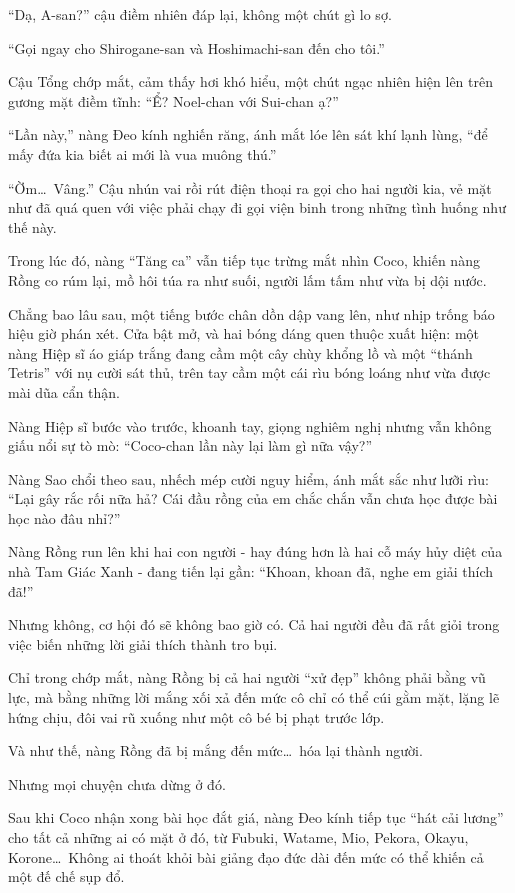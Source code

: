 \documentclass[../main.tex]{subfiles}
\begin{document}
``Dạ, A-san?'' cậu điềm nhiên đáp lại, không một chút gì lo sợ.

``Gọi ngay cho Shirogane-san và Hoshimachi-san đến cho tôi.''

Cậu Tổng chớp mắt, cảm thấy hơi khó hiểu, một chút ngạc nhiên hiện lên trên gương mặt điềm tĩnh: ``Ể? Noel-chan với Sui-chan ạ?''

``Lần này,'' nàng Đeo kính nghiến răng, ánh mắt lóe lên sát khí lạnh lùng, ``để mấy đứa kia biết ai mới là vua muông thú.''

``Ờm\dots\ Vâng.'' Cậu nhún vai rồi rút điện thoại ra gọi cho hai người kia, vẻ mặt như đã quá quen với việc phải chạy đi gọi viện binh trong những tình huống như thế này.

Trong lúc đó, nàng ``Tăng ca'' vẫn tiếp tục trừng mắt nhìn Coco, khiến nàng Rồng co rúm lại, mồ hôi túa ra như suối, người lấm tấm như vừa bị dội nước.

\ct

Chẳng bao lâu sau, một tiếng bước chân dồn dập vang lên, như nhịp trống báo hiệu giờ phán xét. Cửa bật mở, và hai bóng dáng quen thuộc xuất hiện: một nàng Hiệp sĩ áo giáp trắng đang cầm một cây chùy khổng lồ và một ``thánh Tetris'' với nụ cười sát thủ, trên tay cầm một cái rìu bóng loáng như vừa được mài dũa cẩn thận.

Nàng Hiệp sĩ bước vào trước, khoanh tay, giọng nghiêm nghị nhưng vẫn không giấu nổi sự tò mò: ``Coco-chan lần này lại làm gì nữa vậy?''

Nàng Sao chổi theo sau, nhếch mép cười nguy hiểm, ánh mắt sắc như lưỡi rìu: ``Lại gây rắc rối nữa hả? Cái đầu rồng của em chắc chắn vẫn chưa học được bài học nào đâu nhỉ?''

Nàng Rồng run lên khi hai con người - hay đúng hơn là hai cỗ máy hủy diệt của nhà Tam Giác Xanh - đang tiến lại gần: ``Khoan, khoan đã, nghe em giải thích đã!''

Nhưng không, cơ hội đó sẽ không bao giờ có. Cả hai người đều đã rất giỏi trong việc biến những lời giải thích thành tro bụi.

Chỉ trong chớp mắt, nàng Rồng bị cả hai người ``xử đẹp'' không phải bằng vũ lực, mà bằng những lời mắng xối xả đến mức cô chỉ có thể cúi gằm mặt, lặng lẽ hứng chịu, đôi vai rũ xuống như một cô bé bị phạt trước lớp.

Và như thế, nàng Rồng đã bị mắng đến mức\dots\ hóa lại thành người.

Nhưng mọi chuyện chưa dừng ở đó.

Sau khi Coco nhận xong bài học đắt giá, nàng Đeo kính tiếp tục ``hát cải lương'' cho tất cả những ai có mặt ở đó, từ Fubuki, Watame, Mio, Pekora, Okayu, Korone\dots\ Không ai thoát khỏi bài giảng đạo đức dài đến mức có thể khiến cả một đế chế sụp đổ.
\end{document}
